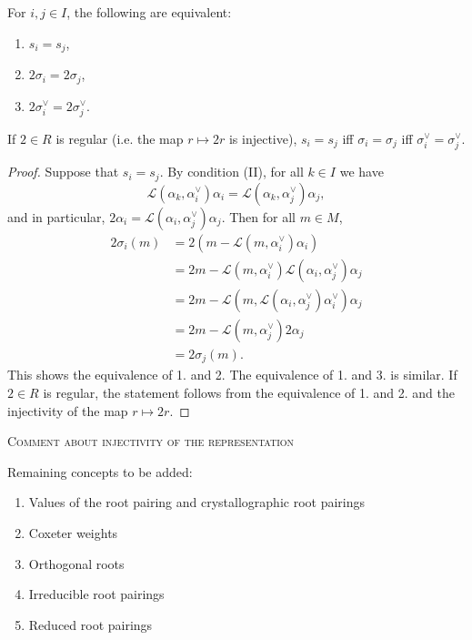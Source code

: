 \begin{lemma}
    For $i,j \in I$, the following are equivalent:
    \begin{enumerate}
        \item $s_i = s_j$,
        \item $2\sigma_i = 2\sigma_j$,
        \item $2\sigma_i^\vee = 2\sigma_j^\vee$.
    \end{enumerate}
    If $2 \in R$ is regular (i.e. the map $r \mapsto 2r$ is injective), $s_i = s_j$ iff
    $\sigma_i = \sigma_j$ iff $\sigma_i^\vee = \sigma_j^\vee$.  
\end{lemma}
\begin{proof}
Suppose that $s_i = s_j$. By condition (II), for all $k \in I$ we have
\[
    \mathcal{L}(\alpha_k,\alpha_i^\vee)\alpha_i = \mathcal{L}(\alpha_k,\alpha_j^\vee)\alpha_j,
\]
and in particular, $2\alpha_i = \mathcal{L}(\alpha_i,\alpha_j^\vee)\alpha_j$. Then for all $m \in M$,
\begin{align*}
    2\sigma_i(m) &= 2(m - \mathcal{L}(m,\alpha^\vee_i)\alpha_i) \\
                &= 2m - \mathcal{L}(m,\alpha^\vee_i)\mathcal{L}(\alpha_i,\alpha_j^\vee)\alpha_j\\
                &= 2m - \mathcal{L}(m,\mathcal{L}(\alpha_i,\alpha_j^\vee)\alpha^\vee_i)\alpha_j\\
                 &= 2m - \mathcal{L}(m,\alpha^\vee_j)2\alpha_j\\
                &= 2 \sigma_j(m).
\end{align*}
This shows the equivalence of 1. and 2. The equivalence of 1. and 3. is similar. If $2 \in R$ is regular, 
the statement follows from the equivalence of 1. and 2. and the injectivity of the map $r \mapsto 2r$.
\end{proof}

\textsc{Comment about injectivity of the representation}






Remaining concepts to be added:
\begin{enumerate}
    \item Values of the root pairing and crystallographic root pairings
    \item Coxeter weights
    \item Orthogonal roots 
    \item Irreducible root pairings
    \item Reduced root pairings
\end{enumerate}